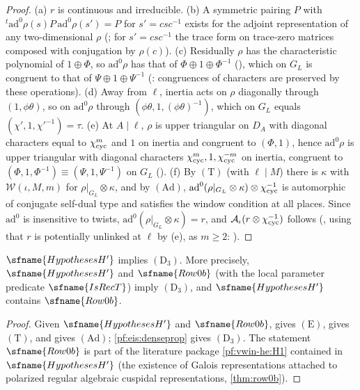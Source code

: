 \begin{proof}
(a) $r$ is continuous and irreducible. (b) A symmetric pairing $P$ with ${}^t\mathrm{ad}^0\rho(s)P\,\mathrm{ad}^0\rho(s')=P$ for $s'=csc^{-1}$ exists
for the adjoint representation of any two-dimensional $\rho$ (; for $s'=csc^{-1}$
the trace form on trace-zero matrices composed with conjugation by $\rho(c)$). (c) Residually $\rho$ has the characteristic polynomial of
$1\oplus\Phi$, so $\mathrm{ad}^0\rho$ has that of $\Phi\oplus1\oplus\Phi^{-1}$ (), which on $G_L$ is congruent to
that of $\Psi\oplus1\oplus\Psi^{-1}$ (: congruences of characters are preserved by these operations).
(d) Away from $\ell$, inertia acts on $\rho$ diagonally through $(1,\phi\theta)$, so on $\mathrm{ad}^0\rho$ through $(\phi\theta,1,(\phi\theta)^{-1})$, which
on $G_L$ equals $(\chi',1,\chi'^{-1})=\tau$. (e) At $A\mid\ell$, $\rho$ is upper triangular on $D_A$ with diagonal characters equal to $\chi_{\mathrm{cyc}}^m$ and $1$ on inertia and congruent to
$(\Phi,1)$, hence $\mathrm{ad}^0\rho$ is upper triangular with diagonal characters $\chi_{\mathrm{cyc}}^{m},1,\chi_{\mathrm{cyc}}^{-m}$ on inertia, congruent to
$(\Phi,1,\Phi^{-1})\equiv(\Psi,1,\Psi^{-1})$ on $G_L$ (). (f) By $(\mathrm{T})$ (with
$\ell\mid M$) there is $\kappa$ with $\mathcal W(\iota,M,m)$ for $\rho|_{G_L}\otimes\kappa$, and by $(\mathrm{Ad})$,
$\mathrm{ad}^0(\rho|_{G_L}\otimes\kappa)\otimes\chi_{\mathrm{cyc}}^{-1}$ is automorphic of conjugate self-dual type and satisfies the window condition at all
places. Since $\mathrm{ad}^0$ is insensitive to twists, $\mathrm{ad}^0(\rho|_{G_L}\otimes\kappa)=r$, and $\mathcal A_\iota(r\otimes\chi_{\mathrm{cyc}}^{-1})$ follows
(, using that $r$ is potentially unlinked at $\ell$ by (e), as $m\ge2$:
).
\end{proof}

\begin{theorem}\label{pf:eis:dense}
$\sfname{HypothesesH'}$ implies $(\mathrm{D}_3)$. More precisely, $\sfname{HypothesesH'}$ and $\sfname{Row0b}$ (with the local parameter
predicate $\sfname{IsRecT}$) imply $(\mathrm{D}_3)$, and $\sfname{HypothesesH'}$ contains $\sfname{Row0b}$.
\end{theorem}

\begin{proof}
Given $\sfname{HypothesesH'}$ and $\sfname{Row0b}$,  gives $(\mathrm{E})$,
 gives $(\mathrm{T})$, and
 gives $(\mathrm{Ad})$; \cref{pf:eis:denseprop} gives
$(\mathrm{D}_3)$. The statement $\sfname{Row0b}$ is part of the literature package \ref{pf:vwin-he:H1} contained in
$\sfname{HypothesesH'}$ (the existence of Galois representations attached to polarized regular algebraic cuspidal representations,
\cref{thm:row0b}).
\end{proof}

